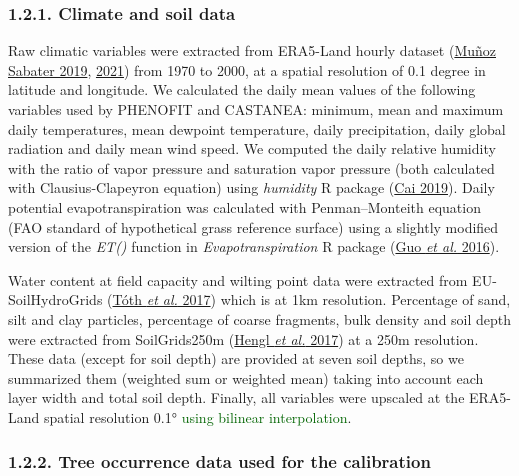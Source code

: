 \documentclass[11pt,]{article}
\begin{document}
\hypertarget{climatedata}{%
\subsubsection{1.2.1. Climate and soil data}\label{climatedata}}

Raw climatic variables were extracted from ERA5-Land hourly dataset
(\protect\hyperlink{ref-Sabater2019}{Muñoz Sabater 2019},
\protect\hyperlink{ref-Sabater2021}{2021}) from 1970 to 2000, at a
spatial resolution of 0.1 degree in latitude and longitude. We
calculated the daily mean values of the following variables used by
PHENOFIT and CASTANEA: minimum, mean and maximum daily temperatures,
mean dewpoint temperature, daily precipitation, daily global radiation
and daily mean wind speed. We computed the daily relative humidity with
the ratio of vapor pressure and saturation vapor pressure (both
calculated with Clausius-Clapeyron equation) using \emph{humidity} R
package (\protect\hyperlink{ref-Cai2019}{Cai 2019}). Daily potential
evapotranspiration was calculated with Penman--Monteith equation (FAO
standard of hypothetical grass reference surface) using a slightly
modified version of the \emph{ET()} function in
\emph{Evapotranspiration} R package (\protect\hyperlink{ref-Guo2016}{Guo
\emph{et al.} 2016}).

Water content at field capacity and wilting point data were extracted
from EU-SoilHydroGrids (\protect\hyperlink{ref-Toth2017}{Tóth \emph{et
al.} 2017}) which is at 1km resolution. Percentage of sand, silt and
clay particles, percentage of coarse fragments, bulk density and soil
depth were extracted from SoilGrids250m
(\protect\hyperlink{ref-Hengl2017}{Hengl \emph{et al.} 2017}) at a 250m
resolution. These data (except for soil depth) are provided at seven
soil depths, so we summarized them (weighted sum or weighted mean)
taking into account each layer width and total soil depth. Finally, all
variables were upscaled at the ERA5-Land spatial resolution 0.1°
\textcolor{darkgreen}{using bilinear interpolation}.

\hypertarget{occurrencedata}{%
\subsubsection{1.2.2. Tree occurrence data used for the
calibration}\label{occurrencedata}}
\end{document}
